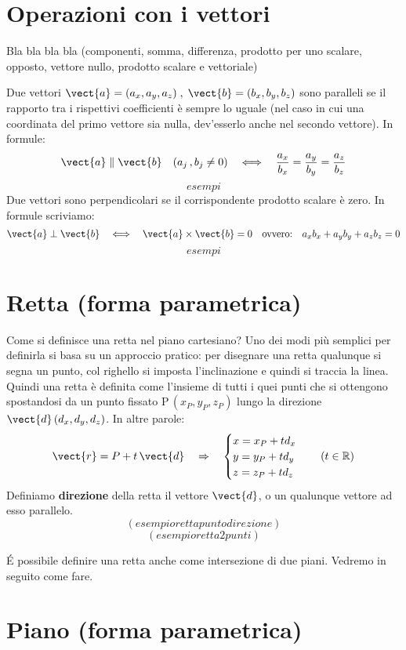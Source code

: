 \section{Operazioni con i vettori}

Bla bla bla bla (componenti, somma, differenza, prodotto per uno scalare, opposto, vettore nullo, prodotto scalare e vettoriale)

Due vettori $ \vect{a} = (a_x,a_y,a_z) \;,\; \vect{b} = (b_x,b_y,b_z)$ sono paralleli se il rapporto tra i rispettivi coefficienti è sempre lo uguale (nel caso in cui una coordinata del primo vettore sia nulla, dev'esserlo anche nel secondo vettore). In formule:
\[\vect{a} \parallel \vect{b} \quad (a_j\,, b_j \neq 0) \quad \Longleftrightarrow \quad \frac{a_x}{b_x} = \frac{a_y}{b_y} = \frac{a_z}{b_z}\]
\[esempi\]
Due vettori sono perpendicolari se il corrispondente prodotto scalare è zero. In formule scriviamo:
\[ \vect{a} \perp \vect{b} \quad \Longleftrightarrow\quad \vect{a} \times \vect{b} = 0 \quad \text{ovvero:} \quad a_xb_x+a_yb_y+a_zb_z=0\]
\[esempi\]

\section{Retta (forma parametrica)}

Come si definisce una retta nel piano cartesiano? Uno dei modi più semplici per definirla si basa su un approccio pratico: per disegnare una retta qualunque si segna un punto, col righello si imposta l'inclinazione e quindi si traccia la linea. Quindi una retta è definita come l'insieme di tutti i quei punti che si ottengono spostandosi da un punto fissato P\,$(x_P,y_P,z_P)$ lungo la direzione $\vect{d}\,(d_x,d_y,d_z)$. In altre parole:
\[\vect{r} = P+t \, \vect{d} \quad \Rightarrow \quad \begin{cases}
x = x_P+t d_x \\
y = y_P+t d_y \\
z = z_P+t d_z
\end{cases}  \quad (t \in \mathbb{R})\]
Definiamo \textbf{direzione} della retta il vettore $\vect{d}$, o un qualunque vettore ad esso parallelo.
\[(esempio retta punto direzione)\]
\[(esempio retta 2 punti)\]

\'E possibile definire una retta anche come intersezione di due piani. Vedremo in seguito come fare.

\section{Piano (forma parametrica)}

